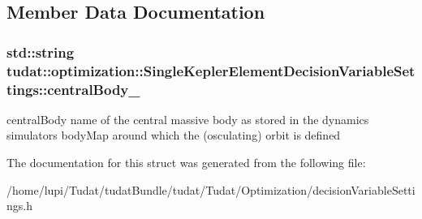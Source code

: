 \subsection{Member Data Documentation}
\subsubsection[{\texorpdfstring{central\+Body\+\_\+}{centralBody_}}]{\setlength{\rightskip}{0pt plus 5cm}std\+::string tudat\+::optimization\+::\+Single\+Kepler\+Element\+Decision\+Variable\+Settings\+::central\+Body\+\_\+}\hypertarget{structtudat_1_1optimization_1_1SingleKeplerElementDecisionVariableSettings_a8758bf783611a52e2479f0f0e7a36ba0}{}\label{structtudat_1_1optimization_1_1SingleKeplerElementDecisionVariableSettings_a8758bf783611a52e2479f0f0e7a36ba0}
central\+Body name of the central massive body as stored in the dynamics simulator\textquotesingle{}s body\+Map around which the (osculating) orbit is defined 

The documentation for this struct was generated from the following file\+:\begin{DoxyCompactItemize}
\item 
/home/lupi/\+Tudat/tudat\+Bundle/tudat/\+Tudat/\+Optimization/decision\+Variable\+Settings.\+h\end{DoxyCompactItemize}
